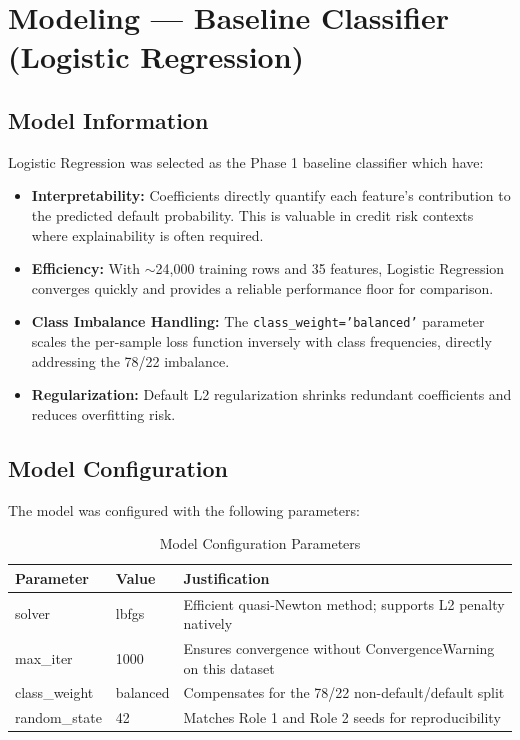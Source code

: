 \section{Modeling --- Baseline Classifier (Logistic Regression)}

\subsection{Model Information}
Logistic Regression was selected as the Phase 1 baseline classifier which have:
\begin{itemize}
    \item \textbf{Interpretability:} Coefficients directly quantify each feature's contribution to the predicted default probability. This is valuable in credit risk contexts where explainability is often required.
    \item \textbf{Efficiency:} With $\sim$24,000 training rows and 35 features, Logistic Regression converges quickly and provides a reliable performance floor for comparison.
    \item \textbf{Class Imbalance Handling:} The \texttt{class\_weight='balanced'} parameter scales the per-sample loss function inversely with class frequencies, directly addressing the 78/22 imbalance.
    \item \textbf{Regularization:} Default L2 regularization shrinks redundant coefficients and reduces overfitting risk.
\end{itemize}

\subsection{Model Configuration}
The model was configured with the following parameters:

\begin{table}[h!]
\centering
\small
\setlength{\tabcolsep}{5pt}
\begin{tabularx}{\textwidth}{llX}
\toprule
\textbf{Parameter} & \textbf{Value} & \textbf{Justification} \\
\midrule
solver & lbfgs & Efficient quasi-Newton method; supports L2 penalty natively \\
max\_iter & 1000 & Ensures convergence without ConvergenceWarning on this dataset \\
class\_weight & balanced & Compensates for the 78/22 non-default/default split \\
random\_state & 42 & Matches Role 1 and Role 2 seeds for reproducibility \\
\bottomrule
\end{tabularx}
\caption{Model Configuration Parameters}
\end{table}

